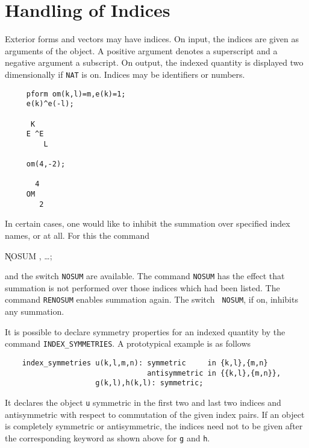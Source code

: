 \section{Handling of Indices}
Exterior forms and vectors may have indices.  On input, the indices
are given as arguments of the object.  A positive argument denotes a
superscript and a negative argument a subscript.  On output, the
indexed quantity is displayed two dimensionally if {\tt NAT} is on.
Indices may be identifiers or numbers.

\example{}

\begin{verbatim}
     pform om(k,l)=m,e(k)=1;
     e(k)^e(-l);

      K
     E ^E
         L

     om(4,-2);

       4
     OM
        2
\end{verbatim}

In certain cases, one would like to inhibit the summation over
specified index names, or at all.  For this the command

\hspace*{2em} \k{NOSUM} , \ldots;\label{NOSUM}

and the switch {\tt NOSUM} are
available.  The command {\tt NOSUM} has the effect that summation is
not performed over those indices which had been listed.  The command
{\tt RENOSUM}\label{RENOSUM} enables summation again.  The switch {\tt
NOSUM}, if on, inhibits any summation.

\label{INDEXSYMMETRIES}
It is possible to declare symmetry properties for an indexed quantity by
the command {\tt INDEX\_SYMMETRIES}. A prototypical example is as
follows

\begin{verbatim}
    index_symmetries u(k,l,m,n): symmetric     in {k,l},{m,n}
                                 antisymmetric in {{k,l},{m,n}},
                     g(k,l),h(k,l): symmetric;
\end{verbatim}

It declares the object {\tt u} symmetric in the first two and last
two indices and antisymmetric with respect to commutation of the given
index pairs. If an object is completely symmetric or antisymmetric,
the indices need not to be given after the corresponding keyword as
shown above for {\tt g} and {\tt h}.

